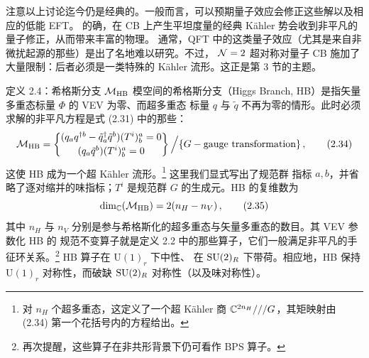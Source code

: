 注意以上讨论迄今仍是经典的。一般而言，可以预期量子效应会修正这些解以及相应的低能 EFT。
的确，在 CB 上产生平坦度量的经典 Kähler 势会收到非平凡的量子修正，从而带来丰富的物理。
通常，QFT 中的这类量子效应（尤其是来自非微扰起源的那些）是出了名地难以研究。不过，
$\mathcal{N}=2$ 超对称对量子 CB 施加了大量限制：后者必须是一类特殊的 Kähler 流形。这正是第 3 节的主题。


\begin{definitionbox}{定义 2.4：希格斯分支 $\mathcal{M}_{\mathrm{HB}}$}
  模空间的希格斯分支（Higgs Branch, HB）是指矢量多重态标量 $\Phi$ 的 VEV 为零、而超多重态
  标量 $q$ 与 $\tilde q$ 不再为零的情形。此时必须求解的非平凡方程是式 (2.31) 中的那些：
  \begin{equation}
    \mathcal{M}_{\mathrm{HB}}=\left\{\begin{matrix}
      (q_a q^{\dagger b}-\tilde q_a^{\dagger}\tilde q^{b})(T^i)_b^{a}=0\\[2pt]
      (q_a\tilde q^{b})(T^i)_b^{a}=0
    \end{matrix}\right\}\Big/\{G-\text{gauge transformation}\}\,,
    \tag{2.34}
  \end{equation}
  这使 HB 成为一个超 Kähler 流形。\footnote{对 $n_H$ 个超多重态，这定义了一个超 Kähler 商
  $\mathbb{C}^{2n_H}///G$，其矩映射由 (2.34) 第一个花括号内的方程给出。} 这里我们显式写出了规范群
  指标 $a,b$，并省略了逐对缩并的味指标；$T^i$ 是规范群 $G$ 的生成元。HB 的复维数为
  \begin{equation}
    \dim_{\mathbb{C}}(\mathcal{M}_{\mathrm{HB}})=2(n_H-n_V)\,,
    \tag{2.35}
  \end{equation}
  其中 $n_H$ 与 $n_V$ 分别是参与希格斯化的超多重态与矢量多重态的数目。其 VEV 参数化 HB 的
  规范不变算子就是定义 2.2 中的那些算子，它们一般满足非平凡的手征环关系。\footnote{%
  再次提醒，这些算子在非共形背景下仍可看作 BPS 算子。} HB 算子在 $\mathrm{U}(1)_r$ 下中性、
  在 $\mathrm{SU}(2)_R$ 下带荷。相应地，HB 保持 $\mathrm{U}(1)_r$ 对称性，而破缺 $\mathrm{SU}(2)_R$
  对称性（以及味对称性）。
\end{definitionbox}


